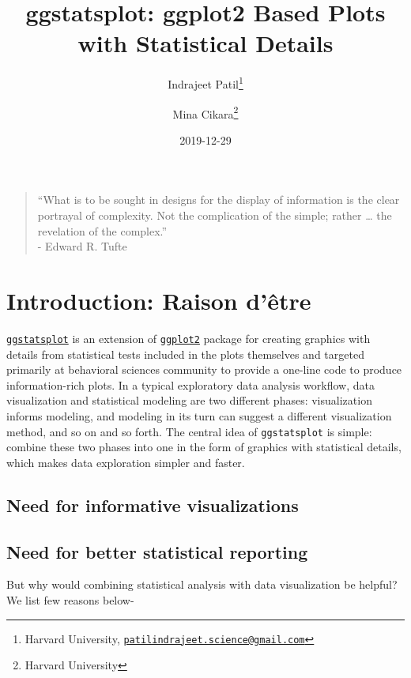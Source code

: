 \documentclass[
]{article}
\title{ggstatsplot: ggplot2 Based Plots with Statistical Details}
\author{Indrajeet Patil\footnote{Harvard University, \href{mailto:patilindrajeet.science@gmail.com}{\nolinkurl{patilindrajeet.science@gmail.com}}} \and Mina Cikara\footnote{Harvard University}}
\date{2019-12-29}
\begin{document}
\maketitle

{
\hypersetup{linkcolor=}
\setcounter{tocdepth}{2}
\tableofcontents
}
\begin{quote}
``What is to be sought in designs for the display of information is the clear
portrayal of complexity. Not the complication of the simple; rather \ldots{} the
revelation of the complex.''\\
- Edward R. Tufte
\end{quote}

\hypertarget{introduction-raison-duxeatre}{%
\section{Introduction: Raison d'être}\label{introduction-raison-duxeatre}}

\href{https://indrajeetpatil.github.io/ggstatsplot/}{\texttt{ggstatsplot}} is an extension
of \href{https://github.com/tidyverse/ggplot2}{\texttt{ggplot2}} package for creating
graphics with details from statistical tests included in the plots themselves
and targeted primarily at behavioral sciences community to provide a one-line
code to produce information-rich plots. In a typical exploratory data analysis
workflow, data visualization and statistical modeling are two different phases:
visualization informs modeling, and modeling in its turn can suggest a
different visualization method, and so on and so forth. The central idea of
\texttt{ggstatsplot} is simple: combine these two phases into one in the form of
graphics with statistical details, which makes data exploration simpler and
faster.

\hypertarget{need-for-informative-visualizations}{%
\subsection{Need for informative visualizations}\label{need-for-informative-visualizations}}

\hypertarget{need-for-better-statistical-reporting}{%
\subsection{Need for better statistical reporting}\label{need-for-better-statistical-reporting}}

But why would combining statistical analysis with data visualization be helpful?
We list few reasons below-
\end{document}
